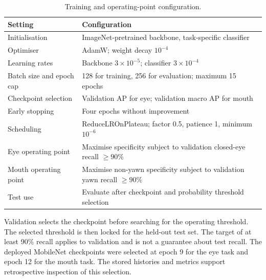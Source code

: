 \documentclass[pdflatex,sn-mathphys-num]{sn-jnl}
\begin{document}
\begin{table}[htbp]
\caption{Training and operating-point configuration.}\label{tab:training}
\begin{tabularx}{\textwidth}{@{}p{4.2cm}Y@{}}
\toprule
Setting & Configuration \\
\midrule
Initialisation & ImageNet-pretrained backbone, task-specific classifier \\
Optimiser & AdamW; weight decay $10^{-4}$ \\
Learning rates & Backbone $3\times10^{-5}$; classifier $3\times10^{-4}$ \\
Batch size and epoch cap & 128 for training, 256 for evaluation; maximum 15 epochs \\
Checkpoint selection & Validation AP for eye; validation macro AP for mouth \\
Early stopping & Four epochs without improvement \\
Scheduling & ReduceLROnPlateau; factor 0.5, patience 1, minimum $10^{-6}$ \\
Eye operating point & Maximise specificity subject to validation closed-eye recall $\geq90\%$ \\
Mouth operating point & Maximise non-yawn specificity subject to validation yawn recall $\geq90\%$ \\
Test use & Evaluate after checkpoint and probability threshold selection \\
\bottomrule
\end{tabularx}
\end{table}

Validation selects the checkpoint before searching for the operating threshold. The selected threshold is then locked for the held-out test set. The target of at least 90\% recall applies to validation and is not a guarantee about test recall. The deployed MobileNet checkpoints were selected at epoch 9 for the eye task and epoch 12 for the mouth task. The stored histories and metrics support retrospective inspection of this selection.
\end{document}
